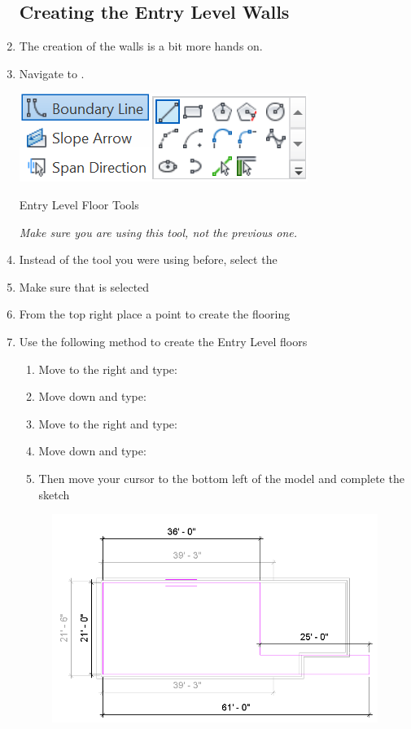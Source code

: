 \documentclass{tufte-book} %
\begin{document}
\begin{enumerate}
	\subsection{Creating the Entry Level Walls}
	\item The creation of the  walls is a bit more hands on.
	\item Navigate to .
	\begin{marginfigure}
		\includegraphics[width=\linewidth]{revitupperfloortool.png}
		\caption{Entry Level Floor Tools}
		\emph{Make sure you are using this tool, not the previous one.}
		\label{fig:revupperlevelfloortool}
	\end{marginfigure}
	\item Instead of the tool you were using before, select the 
	\item Make sure that  is selected
	\item From the top right place a point to create the flooring
	\item Use the following method to create the Entry Level floors
	\begin{enumerate}
		\item Move to the right and type: 
		\item Move down and type: 
		\item Move to the right and type: 
		\item Move down and type: 
		\item Then move your cursor to the bottom left of the model and complete the sketch
	\end{enumerate}
	\begin{figure}
	\includegraphics[width=\linewidth]{revitupperlevelfloors.png}

\end{figure}
\end{enumerate}
\end{document}
